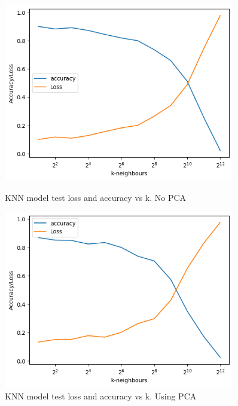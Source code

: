 \documentclass[12pt,a4paper]{article}
\begin{document}
    \begin{figure}[h]
        \centering
        \begin{minipage}{0.45\textwidth}
            \centering
            \includegraphics[width=0.9\textwidth]{knn-nopca} %
            \caption{KNN model test loss and accuracy vs k. No PCA}
            \label{fig:knn-nopca}
        \end{minipage}\hfill
        \begin{minipage}{0.45\textwidth}
            \centering
            \includegraphics[width=0.9\textwidth]{knn-pca} %
            \caption{KNN model test loss and accuracy vs k. Using PCA}
            \label{fig:knn-pca}
        \end{minipage}
    \end{figure}
\end{document}
